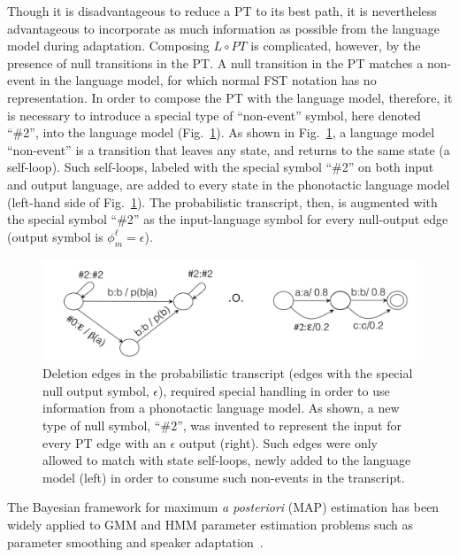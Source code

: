 Though it is disadvantageous to reduce a PT to its best path, it is
nevertheless advantageous to incorporate as much information as
possible from the language model during adaptation.  Composing $L\circ
PT$ is complicated, however, by the presence of null transitions in
the PT.  A null transition in the PT matches a non-event in the
language model, for which normal FST notation has no representation.
In order to compose the PT with the language model, therefore, it is
necessary to introduce a special type of ``non-event'' symbol, here
denoted ``\#2'', into the language model (Fig.~\ref{fig:liu1}).  As
shown in Fig.~\ref{fig:liu1}, a language model ``non-event'' is a
transition that leaves any state, and returns to the same state (a
self-loop).  Such self-loops, labeled with the special symbol ``\#2''
on both input and output language, are added to every state in the
phonotactic language model (left-hand side of Fig.~\ref{fig:liu1}).
The probabilistic transcript, then, is augmented with the special
symbol ``\#2'' as the input-language symbol for every null-output edge
(output symbol is $\phi_m^\ell =\epsilon$).

\begin{figure}
  \centerline{\includegraphics[width=5in]{../figs/liu1.png}}
  \caption{Deletion edges in the probabilistic transcript (edges with
    the special null output symbol, $\epsilon$), required special
    handling in order to use information from a phonotactic language
    model.  As shown, a new type of null symbol, ``\#2'', was invented
    to represent the input for every PT edge with an $\epsilon$ output
    (right).  Such edges were only allowed to match with state
    self-loops, newly added to the language model (left) in order to
    consume such non-events in the transcript.}
  \label{fig:liu1}
\end{figure}

The Bayesian framework for maximum {\em a posteriori} (MAP) estimation has
been widely applied to GMM and HMM parameter estimation problems such
as parameter smoothing and speaker
adaptation~\cite{gauvain1994maximum}.

